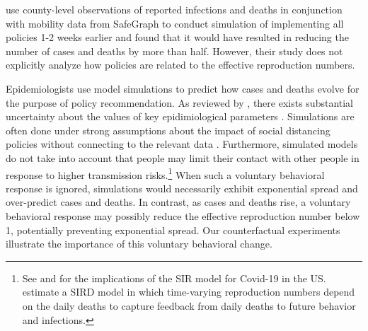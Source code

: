 \documentclass[11pt,reqno,letter]{amsart}
\theoremstyle{definition}
\begin{document}
 \cite{pei2020} use county-level observations of reported infections and deaths in conjunction with mobility  data from SafeGraph to conduct simulation of implementing all policies 1-2 weeks earlier and found that it would have resulted in reducing the number of cases and deaths by more than half. However, their study does not  explicitly analyze how policies are related to the effective reproduction numbers. %

Epidemiologists use model simulations to predict how cases and deaths evolve for the purpose of policy recommendation. As reviewed by \cite{avery2020}, there exists substantial uncertainty about the values of key epidimiological parameters \citep[see also][]{atkeson2020b,stock2020}. Simulations are often done under strong assumptions about the impact of social distancing policies without connecting to the relevant data  \citep[e.g.,][]{ferguson2020}. Furthermore, simulated models do not take into account that people may limit their contact with other people in response to higher transmission risks.\footnote{See \cite{atkeson2020a} and \cite{stock2020} for the implications of the SIR model for Covid-19 in the US. \cite{NBERw27128} estimate a SIRD model in which time-varying reproduction numbers depend on the daily deaths to capture feedback from daily deaths to future behavior and infections.}  When such a voluntary behavioral response is ignored, simulations would necessarily exhibit exponential spread and over-predict  cases and deaths. In contrast, as cases and deaths rise, a voluntary behavioral response may possibly reduce the effective reproduction number  below 1,  potentially preventing exponential spread. Our counterfactual experiments  illustrate the importance of this voluntary behavioral change.
\end{document}
